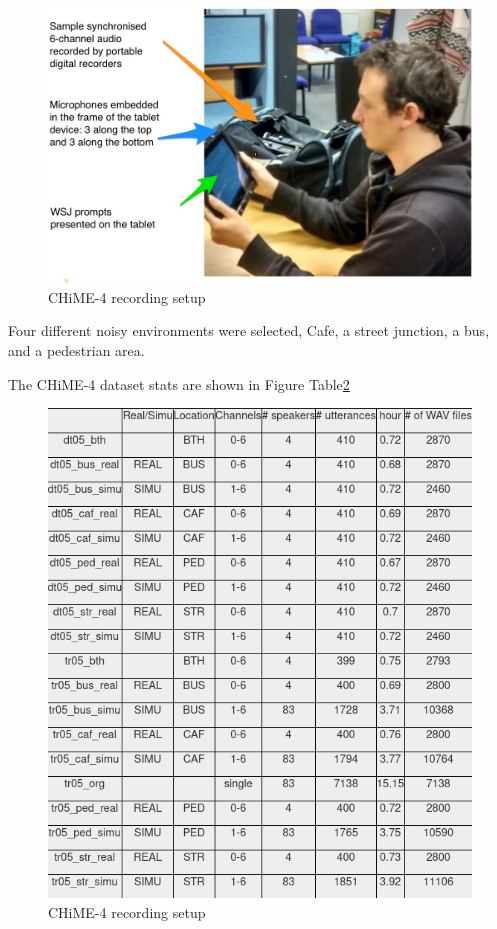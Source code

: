 \begin{figure}[H]
    \centering
    \includegraphics[width=0.75\linewidth]{Datasets/images/chime4_rec_device}
    \caption{CHiME-4 recording setup}\label{fig:chime4_rec_device}
\end{figure}

Four different noisy environments were selected, Cafe, a street junction, a bus, and a pedestrian area.

The CHiME-4 dataset stats are shown in Figure Table\;\ref{fig:chime4_stats}

\begin{figure}[H]
    \centering
    \includegraphics[width=0.75\linewidth]{Datasets/images/chime4_stats}
    \caption{CHiME-4 recording setup}\label{fig:chime4_stats}
\end{figure}


